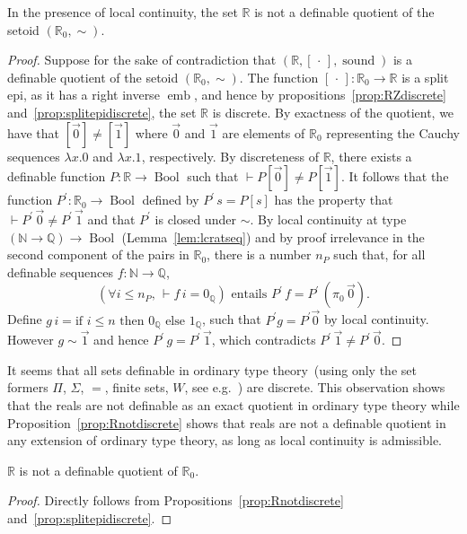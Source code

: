 \documentclass[envcountsame]{llncs}
\newcommand{\N}{\mathbb{N}}
\newcommand{\Q}{\mathbb{Q}}
\newcommand{\R}{\mathbb{R}}
\newcommand{\dotph}{\,\cdot\,} %
\providecommand{\class}[1]{[#1]}
\DeclareMathOperator{\Bool}{Bool}
\DeclareMathOperator{\sound}{sound}
\DeclareMathOperator{\emb}{emb}
\begin{document}
\begin{proposition}\label{prop:Rnotdiscrete} In the presence of local continuity, the set $\R$ is not a definable quotient of the setoid $(\R_0,\sim)$.
\end{proposition}
\begin{proof}
Suppose for the sake of contradiction that $(\R,\class\dotph, \sound)$ is a definable quotient of the setoid $(\R_0,\sim)$. The function $\class\dotph\colon \R_0\to\R$ is a split epi, as it has a right inverse $\emb$, and hence by propositions~\ref{prop:RZdiscrete} and~\ref{prop:splitepidiscrete}, the set $\R$ is discrete. By exactness of the quotient,  we have that $\class{\vec 0} \neq \class{\vec 1}$ where $\vec 0$ and $\vec 1$ are  elements of $\R_0$ representing the Cauchy sequences $\lambda x.0$ and $\lambda x.1$, respectively. By discreteness of $\R$, there exists a definable function $P:\R\to\Bool$
such that $\vdash P\class{\vec 0}\neq P\class{\vec 1 }$. It follows that the  function $P^\prime:\R_0\to\Bool$ defined by $P^\prime\,s = P\class{s}$ has the property that $\vdash P^\prime\,\vec0\neq P^\prime\,\vec 1$ and that $P^\prime$ is closed under $\sim$. By local continuity at type $(\N\to\Q)\to\Bool$ (Lemma~\ref{lem:lcratseq}) and by proof irrelevance in the second component of the pairs in $\R_0$, there is a number $n_P$  such that, for all definable sequences $f\colon\N\to\Q$,
\[
\left(\forall i\leq n_P,\, \vdash f\,i = 0_\Q\right)\text{ entails } P^\prime \, f = P^\prime\,(\pi_0\,\vec0).
\]
Define $g\,i=\text{if } i\leq n \text{ then } 0_\Q \text{ else } 1_\Q$, such that $P^\prime g =P^\prime \vec 0$ by local continuity. However $g \sim \vec 1$ and hence $P^\prime\,g=P^\prime\,\vec 1$, which contradicts $P^\prime\,\vec 1 \neq P^\prime\,\vec 0$.

\end{proof}

It seems that all sets definable in ordinary type theory~(using only the set formers $\Pi$, $\Sigma$, $=$, finite sets, $W$, see e.g.~\cite{nordstrom1990programming}) are discrete. This observation shows that the reals are not  definable as an exact quotient in ordinary type theory while Proposition~\ref{prop:Rnotdiscrete} shows that reals are not a definable  quotient in any extension of ordinary type theory, as long as local continuity is admissible.



\begin{corollary}
$\R$ is not a definable quotient of $\R_0$.
\end{corollary}
\begin{proof}
Directly follows from Propositions~\ref{prop:Rnotdiscrete} and~\ref{prop:splitepidiscrete}.
\end{proof}
\end{document}
